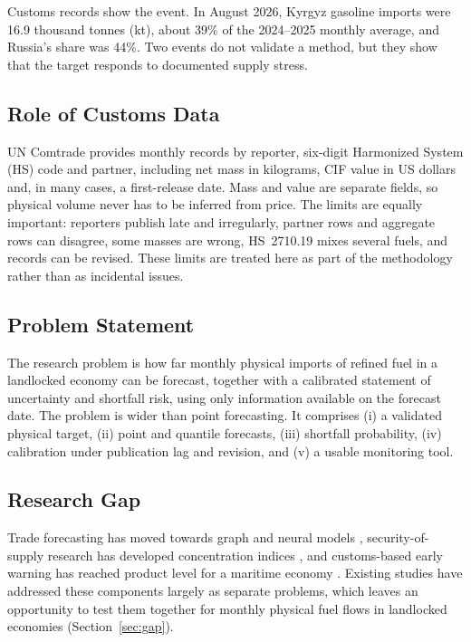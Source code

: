 \documentclass[conference]{IEEEtran}
\begin{document}
Customs records show the event. In August 2026, Kyrgyz gasoline imports were 16.9 thousand tonnes (kt), about 39\% of the 2024--2025 monthly average, and Russia's share was 44\%. Two events do not validate a method, but they show that the target responds to documented supply stress.

\subsection{Role of Customs Data}
UN Comtrade \cite{comtrade} provides monthly records by reporter, six-digit Harmonized System (HS) code and partner, including net mass in kilograms, CIF value in US dollars and, in many cases, a first-release date. Mass and value are separate fields, so physical volume never has to be inferred from price. The limits are equally important: reporters publish late and irregularly, partner rows and aggregate rows can disagree, some masses are wrong, HS~2710.19 mixes several fuels, and records can be revised. These limits are treated here as part of the methodology rather than as incidental issues.

\subsection{Problem Statement}
The research problem is how far monthly physical imports of refined fuel in a landlocked economy can be forecast, together with a calibrated statement of uncertainty and shortfall risk, using only information available on the forecast date. The problem is wider than point forecasting. It comprises (i) a validated physical target, (ii) point and quantile forecasts, (iii) shortfall probability, (iv) calibration under publication lag and revision, and (v) a usable monitoring tool.

\subsection{Research Gap}
Trade forecasting has moved towards graph and neural models \cite{zhao2026,sellami2024,ma2024}, security-of-supply research has developed concentration indices \cite{cohen2011,lecoq2009,ang2015}, and customs-based early warning has reached product level for a maritime economy \cite{kwon2026}. Existing studies have addressed these components largely as separate problems, which leaves an opportunity to test them together for monthly physical fuel flows in landlocked economies (Section~\ref{sec:gap}).
\end{document}
